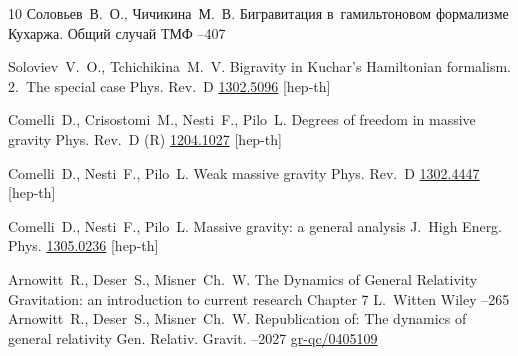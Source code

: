 \begin{thebibliography}{10}
\by Соловьев~В.~О., Чичикина~М.~В.
\paper Бигравитация в~гамильтоновом формализме Кухаржа. Общий случай
\jour ТМФ
--407

\by  Soloviev~V.~O., Tchichikina~M.~V.
\paper Bigravity in Kuchar's Hamiltonian formalism. 2.~The special case
\jour Phys. Rev.~D  
\arxiv \href{http://arxiv.org/abs/1302.5096}{1302.5096} [hep-th] 

\by Comelli~D., Crisostomi~M., Nesti~F., Pilo~L.
\paper  Degrees of freedom in massive gravity 
\jour  Phys. Rev.~D
(R) 
\arxiv \href{http://arxiv.org/abs/1204.1027}{1204.1027} [hep-th] 


\by Comelli~D., Nesti~F., Pilo~L.
\paper  Weak massive gravity 
\jour Phys. Rev.~D 
\arxiv \href{http://arxiv.org/abs/1302.4447}{1302.4447} [hep-th] 

\by Comelli~D., Nesti~F., Pilo~L.
\paper Massive gravity: a general analysis
\jour J.~High Energ. Phys. 
\arxiv \href{http://arxiv.org/abs/1305.0236}{1305.0236} [hep-th] 


\by Arnowitt~R., Deser~S., Misner~Ch.~W.
\paper The Dynamics of General Relativity
\inbook  Gravitation: an introduction to current research
\paperinfo Chapter 7
\ed L.~Witten 
\publ Wiley 
--265
\moreref
\by Arnowitt~R., Deser~S., Misner~Ch.~W.
\paper Republication of: The dynamics of general relativity
\jour Gen. Relativ. Gravit.
--2027 
\arxiv \href{http://arxiv.org/abs/gr-qc/0405109}{gr-qc/0405109}




\end{thebibliography}
